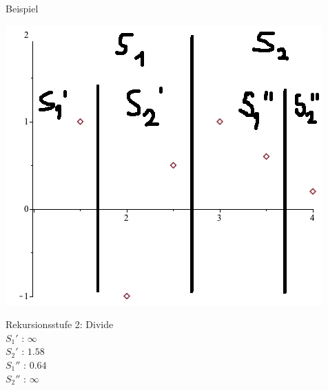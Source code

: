 \documentclass[18pt]{beamer}
\begin{document}
		\begin{frame}{Beispiel}
			\begin{minipage}{0.45\textwidth}
				\includegraphics[width =\textwidth]{logos/PlotsBetter02.png}
			\end{minipage}
			\begin{minipage}{0.45\textwidth}
				Rekursionsstufe 2: Divide\\
				$S_1'  \text{ : }  \infty$ \\	
				$S_2'  \text{ : }  1.58 $ \\
				$S_1''  \text{ : }  0.64$ \\
				$S_2''  \text{ : }  \infty$		
			\end{minipage}
		\end{frame}
\end{document}
